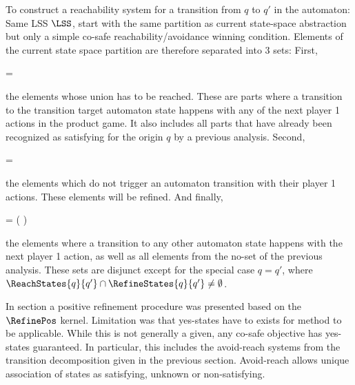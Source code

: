     To construct a reachability system for a transition from $q$ to $q'$ in the automaton:
    Same LSS $\LSS$, start with the same partition as current state-space abstraction but only a simple co-safe reachability/avoidance winning condition.
    Elements of the current state space partition are therefore separated into 3 sets:
    First,

    \startformula
         =  \EndComma
    \stopformula

    the elements whose union has to be reached.
    These are parts where a transition to the transition target automaton state happens with any of the next player 1 actions in the product game.
    It also includes all parts that have already been recognized as satisfying for the origin $q$ by a previous analysis.
    Second,

    \startformula
         =  \EndComma
    \stopformula

    the elements which do not trigger an automaton transition with their player 1 actions.
    These elements will be refined.
    And finally,

    \startformula
         =  \setminus \left(  \cup {} \right) \EndComma
    \stopformula

    the elements where a transition to any other automaton state happens with the next player 1 action, as well as all elements from the no-set of the previous analysis.
    These sets are disjunct except for the special case $q = q'$, where $\ReachStates{q}{q'} \cap \RefineStates{q}{q'} \ne \emptyset$.

\stopsubsection


\startsubsection[title={Robust Reachability Refinement},reference=sec:refinement-transition-reachability]

    In section  a positive refinement procedure was presented based on the $\RefinePos$ kernel.
    Limitation was that yes-states have to exists for method to be applicable.
    While this is not generally a given, any co-safe objective has yes-states guaranteed.
    In particular, this includes the avoid-reach systems from the transition decomposition given in the previous section.
    Avoid-reach allows unique association of states as satisfying, unknown or non-satisfying.


